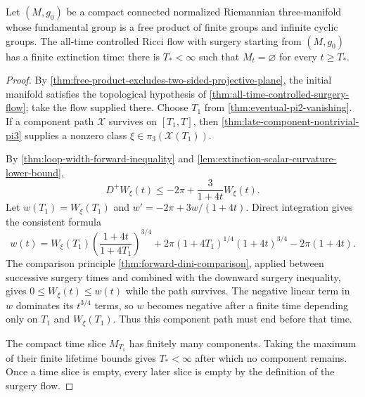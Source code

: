 \begin{theorem}
\label{thm:finite-time-extinction}
\notready
Let $(M,g_0)$ be a compact connected normalized Riemannian three-manifold
whose fundamental group is a free product of finite groups and infinite
cyclic groups.  The all-time controlled Ricci flow with surgery starting from
$(M,g_0)$ has a finite extinction time: there is $T_*<\infty$ such that
$M_t=\varnothing$ for every $t\ge T_*$.
\end{theorem}

\begin{proof}
By \ref{thm:free-product-excludes-two-sided-projective-plane}, the initial
manifold satisfies the topological hypothesis of
\ref{thm:all-time-controlled-surgery-flow}; take the flow supplied there.
Choose $T_1$ from \ref{thm:eventual-pi2-vanishing}.  If a component path
$\mathcal X$ survives on $[T_1,T]$, then
\ref{thm:late-component-nontrivial-pi3} supplies a nonzero class
$\xi\in\pi_3(\mathcal X(T_1))$.

By \ref{thm:loop-width-forward-inequality} and
\ref{lem:extinction-scalar-curvature-lower-bound},
\[
 D^+W_\xi(t)\le-2\pi+\frac3{1+4t}W_\xi(t).
\]
Let $w(T_1)=W_\xi(T_1)$ and
$w'=-2\pi+3w/(1+4t)$.  Direct integration gives the consistent formula
\[
 w(t)=W_\xi(T_1)
       \left(\frac{1+4t}{1+4T_1}\right)^{3/4}
 +2\pi(1+4T_1)^{1/4}(1+4t)^{3/4}-2\pi(1+4t).
\]
The comparison principle \ref{thm:forward-dini-comparison}, applied between
successive surgery times and combined with the downward surgery inequality,
gives $0\le W_\xi(t)\le w(t)$ while the path survives.  The negative linear
term in $w$ dominates its $t^{3/4}$ terms, so $w$ becomes negative after a
finite time depending only on $T_1$ and $W_\xi(T_1)$.  Thus this component
path must end before that time.

The compact time slice $M_{T_1}$ has finitely many components.  Taking the
maximum of their finite lifetime bounds gives $T_*<\infty$ after which no
component remains.  Once a time slice is empty, every later slice is empty by
the definition of the surgery flow.
\end{proof}
